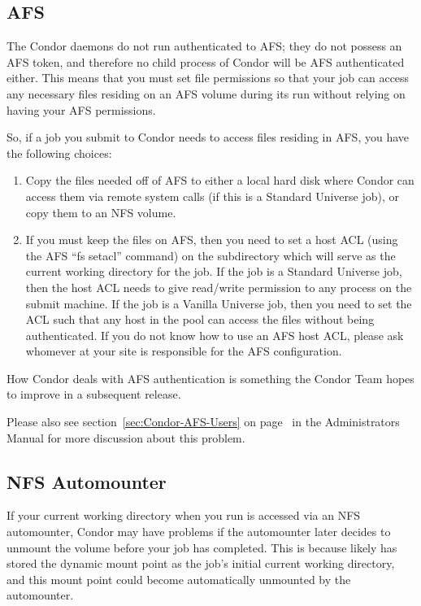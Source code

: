 \subsection{AFS}

The Condor daemons do not run authenticated to AFS; they do not possess
an AFS token, and therefore no child process of Condor will be AFS
authenticated either. This means that you must set file permissions so
that your job can access any necessary files residing on an AFS volume
during its run without relying on having your AFS permissions.

So, if a job you submit to Condor needs to access files residing in AFS,
you have the following choices:
\begin{enumerate}
\item Copy the files needed off of AFS to either a local hard disk where Condor 
can access them via remote system calls (if
this is a Standard Universe job), or copy them to an NFS volume.
\item If you must keep the files on AFS, then you need to set a host ACL
(using the AFS ``fs setacl'' command) on the subdirectory which will
serve as the current working directory for the job.  If the job is a
Standard Universe job, then the host ACL needs to give read/write permission
to any process on the submit machine.  If the job is a Vanilla Universe
job, then you need to set the ACL such that any host in the pool can
access the files without being authenticated.  If you do not know how to
use an AFS host ACL, please ask whomever at your site is responsible for the
AFS configuration.
\end{enumerate}

How Condor deals with AFS authentication is something the Condor Team
hopes to improve in a subsequent release.

Please also see section~\ref{sec:Condor-AFS-Users} on
page~\pageref{sec:Condor-AFS-Users} in the Administrators Manual for
more discussion about this problem.

\subsection{NFS Automounter}

If your current working directory when you run  is
accessed via an NFS automounter, Condor may have problems if the
automounter later decides to unmount the volume before your job has
completed.  This is because  likely has stored the
dynamic mount point as the job's initial current working directory, and
this mount point could become automatically unmounted by the
automounter.

